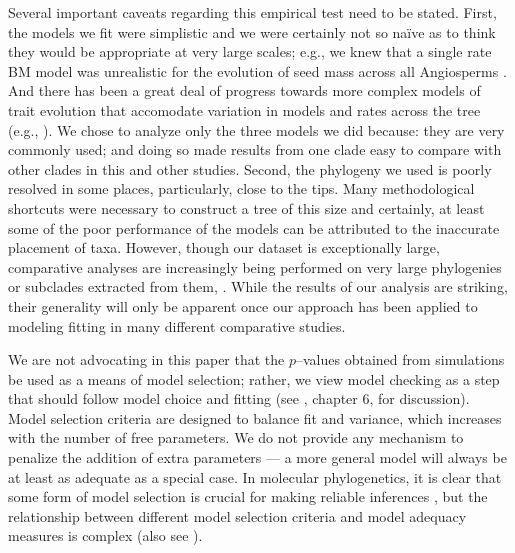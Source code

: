 \documentclass[a4paper,12pt]{article}
\begin{document}
Several important caveats regarding this empirical test need to be stated. First, the models we fit were simplistic and we were certainly not so na\"{i}ve as to think they would be appropriate at very large scales; e.g., we knew that a single rate BM model was unrealistic for the evolution of seed mass across all Angiosperms \citep{Moles2005}. And there has been a great deal of progress towards more complex models of trait evolution that accomodate variation in models and rates across the tree (e.g., \citep{ButlerKing2004, Omeara2006, Eastman2011, Beaulieu2012, SlaterMEE, UyedaBayou}). We chose to analyze only the three models we did because: they are very commonly used; and doing so made results from one clade easy to compare with other clades in this and other studies. Second, the phylogeny we used is poorly resolved in some places, particularly, close to the tips. Many methodological shortcuts were necessary to construct a tree of this size and certainly, at least some of the poor performance of the models can be attributed to the inaccurate placement of taxa. However, though our dataset is exceptionally large, comparative analyses are increasingly being performed on very large phylogenies or subclades extracted from them, \citep{Coopermammal, Jetz2012, Rabosky2013, PyronBurbrink2013, ksi}. While the results of our analysis are striking, their generality will only be apparent once our approach has been applied to modeling fitting in many different comparative studies.

We are not advocating in this paper that the $p$--values obtained from simulations be used as a means of model selection; rather, we view model checking as a step that should follow model choice and fitting (see \citep{Gelmanbook}, chapter 6, for discussion). Model selection criteria are designed to balance fit and variance, which increases with the number of free parameters. We do not provide any mechanism to penalize the addition of extra parameters --- a more general model will always be at least as adequate as a special case. In molecular phylogenetics, it is clear that some form of model selection is crucial for making reliable inferences \citep{SullivanJoyce2005, Ripplinger2008}, but the relationship between different model selection criteria and model adequacy measures is complex \citep{Ripplinger2010} (also see \citep{Boettiger2012}). 
\end{document}
